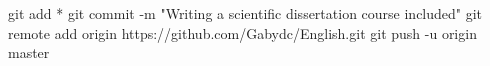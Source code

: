 git add *
git commit -m "Writing a scientific dissertation course included"
git remote add origin https://github.com/Gabydc/English.git
git push -u origin master
